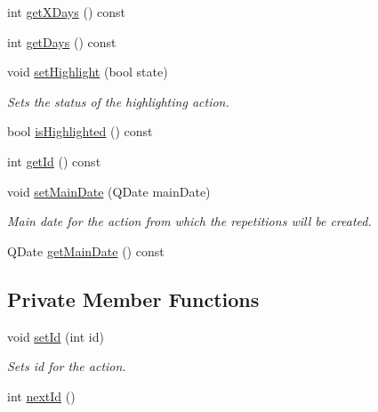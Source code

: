 \begin{DoxyCompactItemize}
int \hyperlink{class_action_a943b631b783f3f42aa672c059184504d}{get\-X\-Days} () const 
\item 
int \hyperlink{class_action_acae2fa92ecec91baff84c7805db253eb}{get\-Days} () const 
\item 
void \hyperlink{class_action_a7995fda15f70ce011df7bc490d178c7f}{set\-Highlight} (bool state)
\begin{DoxyCompactList}\small\item\em Sets the status of the highlighting action. \end{DoxyCompactList}\item 
bool \hyperlink{class_action_ad9eb6b1f91a99bfdaf1a4f80860e6088}{is\-Highlighted} () const 
\item 
int \hyperlink{class_action_a7994d9000bef4a9d1e9c446d1191403e}{get\-Id} () const 
\item 
void \hyperlink{class_action_a35c0fa5853a20c76ea36555652cda3b9}{set\-Main\-Date} (Q\-Date main\-Date)
\begin{DoxyCompactList}\small\item\em Main date for the action from which the repetitions will be created. \end{DoxyCompactList}\item 
Q\-Date \hyperlink{class_action_a815113e01f17c6e579dc772a18cf8de7}{get\-Main\-Date} () const 
\end{DoxyCompactItemize}
\subsection*{Private Member Functions}
\begin{DoxyCompactItemize}
\item 
void \hyperlink{class_action_af9455b0812708a8424e0e14bb926d911}{set\-Id} (int id)
\begin{DoxyCompactList}\small\item\em Sets id for the action. \end{DoxyCompactList}\item 
int \hyperlink{class_action_ab8af5522ac8a15d382f03626844d7d0a}{next\-Id} ()
\end{DoxyCompactItemize}
